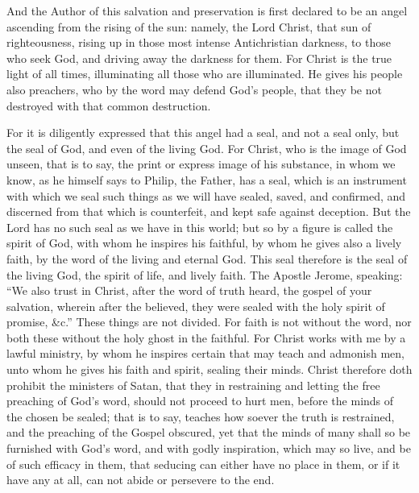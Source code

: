 And the Author of this salvation and preservation is first declared to be an angel ascending from the rising of the sun: namely, the Lord Christ, that sun of righteousness, rising up in those most intense Antichristian darkness, to those who seek God, and driving away the darkness for them. For Christ is the true light of all times, illuminating all those who are illuminated. He gives his people also preachers, who by the word may defend God’s people, that they be not destroyed with that common destruction.

For it is diligently expressed that this angel had a seal, and not a seal only, but the seal of God, and even of the living God. For Christ, who is the image of God unseen, that is to say, the print or express image of his substance, in whom we know, as he himself says to Philip, the Father, has a seal, which is an instrument with which we seal such things as we will have sealed, saved, and confirmed, and discerned from that which is counterfeit, and kept safe against deception. But the Lord has no such seal as we have in this world; but so by a figure is called the spirit of God, with whom he inspires his faithful, by whom he gives also a lively faith, by the word of the living and eternal God. This seal therefore is the seal of the living God, the spirit of life, and lively faith. The Apostle Jerome, speaking: “We also trust in Christ, after the word of truth heard, the gospel of your salvation, wherein after the believed, they were sealed with the holy spirit of promise, \&c.” These things are not divided. For faith is not without the word, nor both these without the holy ghost in the faithful. For Christ works with me by a lawful ministry, by whom he inspires certain that may teach and admonish men, unto whom he gives his faith and spirit, sealing their minds. Christ therefore doth prohibit the ministers of Satan, that they in restraining and letting the free preaching of God’s word, should not proceed to hurt men, before the minds of the chosen be sealed; that is to say, teaches how soever the truth is restrained, and the preaching of the Gospel obscured, yet that the minds of many shall so be furnished with God’s word, and with godly inspiration, which may so live, and be of such efficacy in them, that seducing can either have no place in them, or if it have any at all, can not abide or persevere to the end.

